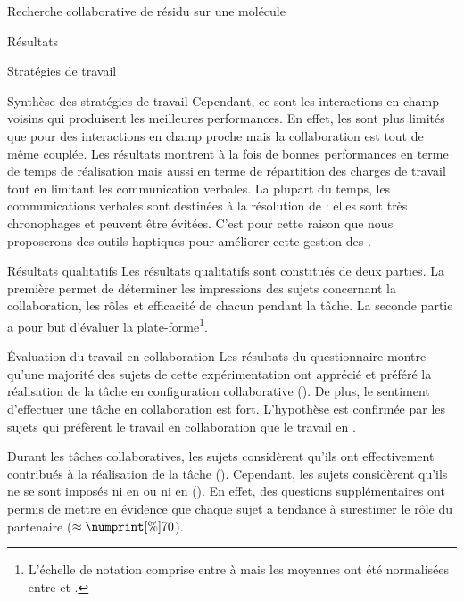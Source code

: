 \documentclass[myfrancais]{mythesis}
\begin{document}
\begin{mychapter}{Recherche collaborative de résidu sur une molécule}
\begin{mysection}{Résultats}
\begin{mysubsection}{Stratégies de travail}
\begin{mysubsubsection}{Synthèse des stratégies de travail}
					Cependant, ce sont les interactions en champ voisins qui produisent les meilleures performances.
					En effet, les  sont plus limités que pour des interactions en champ proche mais la collaboration est tout de même couplée.
					Les résultats montrent à la fois de bonnes performances en terme de temps de réalisation mais aussi en terme de répartition des charges de travail tout en limitant les communication verbales.
					La plupart du temps, les communications verbales sont destinées à la résolution de  : elles sont très chronophages et peuvent être évitées.
					C'est pour cette raison que nous proposerons des outils haptiques pour améliorer cette gestion des  .
				\end{mysubsubsection}
			\end{mysubsection}
			\begin{mysubsection}{Résultats qualitatifs}
				Les résultats qualitatifs sont constitués de deux parties.
				La première permet de déterminer les impressions des sujets concernant la collaboration, les rôles et efficacité de chacun pendant la tâche.
				La seconde partie a pour but d'évaluer la plate-forme\footnote{L'échelle de notation comprise entre  à  mais les moyennes ont été normalisées entre  et .}.
				\begin{mysubsubsection}{Évaluation du travail en collaboration}
					Les résultats du questionnaire montre qu'une majorité des sujets de cette expérimentation ont apprécié et préféré la réalisation de la tâche en configuration collaborative ().
					De plus, le sentiment d'effectuer une tâche en collaboration est fort.
					L'hypothèse  est confirmée par les sujets qui préfèrent le travail en collaboration que le travail en .

					Durant les tâches collaboratives, les sujets considèrent qu'ils ont effectivement contribués à la réalisation de la tâche ().
					Cependant, les sujets considèrent qu'ils ne se sont imposés ni en  ou ni en  ().
					En effet, des questions supplémentaires ont permis de mettre en évidence que chaque sujet a tendance à surestimer le rôle du partenaire ($\approx\mynum[\%]{70}$).


\end{mysubsubsection}
\end{mysubsection}
\end{mysection}
\end{mychapter}
\end{document}
